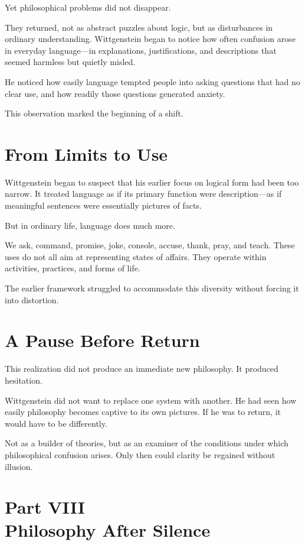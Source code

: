 \documentclass[11pt]{article}
\begin{document}
Yet philosophical problems did not disappear.

They returned, not as abstract puzzles about logic, but as disturbances in ordinary understanding. Wittgenstein began to notice how often confusion arose in everyday language—in explanations, justifications, and descriptions that seemed harmless but quietly misled.

He noticed how easily language tempted people into asking questions that had no clear use, and how readily those questions generated anxiety.

This observation marked the beginning of a shift.

\section*{From Limits to Use}

Wittgenstein began to suspect that his earlier focus on logical form had been too narrow. It treated language as if its primary function were description—as if meaningful sentences were essentially pictures of facts.

But in ordinary life, language does much more.

We ask, command, promise, joke, console, accuse, thank, pray, and teach. These uses do not all aim at representing states of affairs. They operate within activities, practices, and forms of life.

The earlier framework struggled to accommodate this diversity without forcing it into distortion.

\section*{A Pause Before Return}

This realization did not produce an immediate new philosophy. It produced hesitation.

Wittgenstein did not want to replace one system with another. He had seen how easily philosophy becomes captive to its own pictures. If he was to return, it would have to be differently.

Not as a builder of theories, but as an examiner of the conditions under which philosophical confusion arises. Only then could clarity be regained without illusion.

\newpage
\section*{Part VIII \\ Philosophy After Silence}
\end{document}
